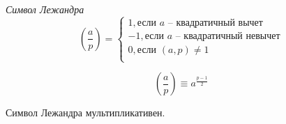 \begin{definition}
    \textit{Символ Лежандра}  
    $$
    \left(\frac{a}{p}\right) = 
    \begin{cases}
        1, \text{если } a \text{ -- квадратичный вычет}\\
        -1, \text{если } a \text{ -- квадратичный невычет}\\
        0, \text{если } (a, p) \neq 1\\
    \end{cases}
    $$
\end{definition}

\begin{note}
    $$
        \left(\frac{a}{p}\right) \equiv a^{ \frac{p - 1}{2} }
    $$
\end{note}

\begin{corollary}
    Символ Лежандра мультипликативен.
\end{corollary}

